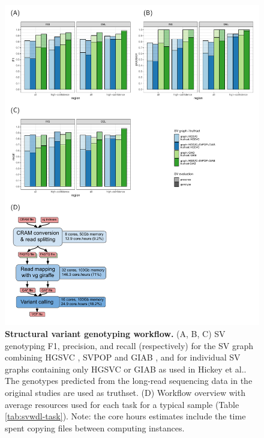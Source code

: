 \documentclass[11pt]{ucscthesis}
\begin{document}
\begin{figure}[htp]
    \centering
    \includegraphics[width=.9\linewidth]{aim2_supplement_wdl-sveval.pdf}
    \caption[Structural variant genotyping workflow]{\textbf{Structural variant genotyping workflow.}
      (A, B, C) SV genotyping F1, precision, and recall (respectively) for the SV graph combining HGSVC \cite{chaisson_sv_2019}, SVPOP \cite{audano_hgsvc} and GIAB \cite{zook_robust_2020}, and for individual SV graphs containing only HGSVC or GIAB as used in Hickey et al.\cite{hickey_vgsv_2020}.
      The genotypes predicted from the long-read sequencing data in the original studies are used as truthset.
      (D) Workflow overview with average resources used for each task for a typical sample (Table \ref{tab:svwdl-task}). Note: the core hours estimates include the time spent copying files between computing instances.
    }
    \label{fig:sv-wdl-graph}
\end{figure}
\end{document}
